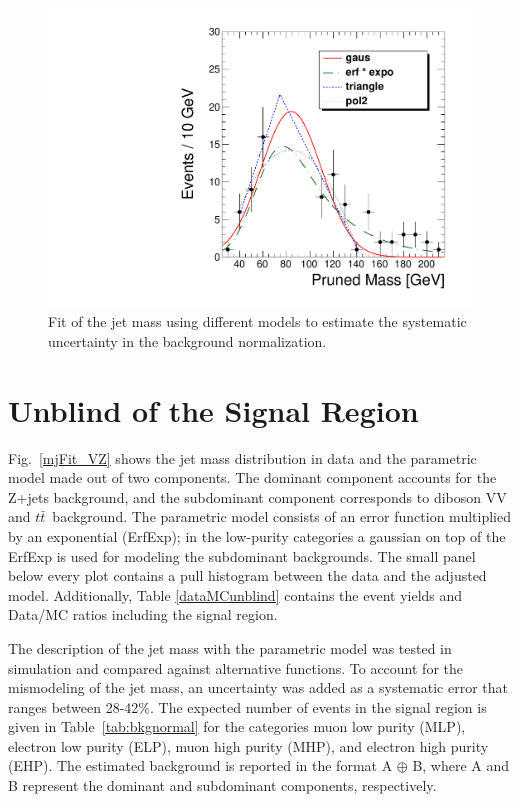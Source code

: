 \begin{figure}[hb!]
\begin{center}
\includegraphics[scale=0.35]{figures/fits/thiagoFitEHP.pdf}
\caption[Jet mass fits in data]{Fit of the jet mass using different models to estimate the systematic uncertainty in the background normalization.}
\label{thiagoFits}
\end{center}
\end{figure}

\clearpage
\section{Unblind of the Signal Region}
Fig.~\ref{mjFit_VZ} shows the jet mass distribution in data and the parametric model made out of two components. The dominant component accounts for the Z+jets background, and the subdominant component corresponds to diboson VV and $t\bar{t}\,$ background. The parametric model consists of an error function multiplied by an exponential (ErfExp); in the low-purity categories a gaussian on top of the ErfExp is used for modeling the subdominant backgrounds. The small panel below every plot contains a pull histogram between the data and the adjusted model. Additionally, Table \ref{dataMCunblind} contains the event yields and Data/MC ratios including the signal region.

The description of the jet mass with the parametric model was tested in simulation and compared against alternative functions. To account for the mismodeling of the jet mass, an uncertainty was added as a systematic error that ranges between 28-42\%. The expected number of events in the signal region is given in Table~\ref{tab:bkgnormal} for the categories muon low purity (MLP), electron low purity (ELP), muon high purity (MHP), and electron high purity (EHP). The estimated background is reported in the format A $\oplus$ B, where A  and B represent the dominant and subdominant components, respectively.


